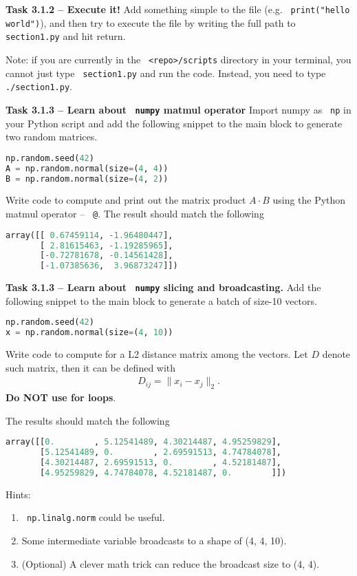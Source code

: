 \documentclass{article}
\def\code#1{\texttt{\color{magenta} #1}}
\begin{document}
{\bf Task 3.1.2 -- Execute it!} Add something simple to the file
(e.g. \code{print("hello world")}), and then try to execute the file by
writing the full path to \code{section1.py} and hit return.

Note: if you are currently in the \code{<repo>/scripts} directory in your terminal,
you cannot just type \code{section1.py} and run the code. Instead, you need to
type \code{./section1.py}.

{\bf Task 3.1.3 -- Learn about \code{numpy} matmul operator}
Import numpy as \code{np} in your Python script and
add the following snippet to the main block to generate two random matrices.
\begin{lstlisting}[language=Python]
np.random.seed(42)
A = np.random.normal(size=(4, 4))
B = np.random.normal(size=(4, 2))
\end{lstlisting}
Write code to compute and print out the matrix product $A \cdot B$
using the Python matmul operator -- \code{@}. The result should match the following
\begin{lstlisting}[language=Python, numbers=none]
array([[ 0.67459114, -1.96480447],
       [ 2.81615463, -1.19285965],
       [-0.72781678, -0.14561428],
       [-1.07385636,  3.96873247]])
\end{lstlisting}

{\bf Task 3.1.3 -- Learn about \code{numpy} slicing and broadcasting.} Add the following
snippet to the main block to generate a batch of size-10 vectors.
\begin{lstlisting}[language=Python]
np.random.seed(42)
x = np.random.normal(size=(4, 10))
\end{lstlisting}
Write code to compute for a L2 distance matrix among the vectors. Let $D$ denote
such matrix, then it can be defined with
\begin{gather}
  D_{ij} = \|x_i - x_j\|_2.
\end{gather}
\textbf{Do NOT use for loops}.

The results should match the following
\begin{lstlisting}[language=Python, numbers=none]
array([[0.        , 5.12541489, 4.30214487, 4.95259829],
       [5.12541489, 0.        , 2.69591513, 4.74784078],
       [4.30214487, 2.69591513, 0.        , 4.52181487],
       [4.95259829, 4.74784078, 4.52181487, 0.        ]])
\end{lstlisting}

Hints:
\begin{enumerate}
  \item \code{np.linalg.norm} could be useful.
  \item Some intermediate variable broadcasts to a shape of (4, 4, 10).
  \item (Optional) A clever math trick can reduce the broadcast size to (4, 4).
\end{enumerate}
\end{document}
